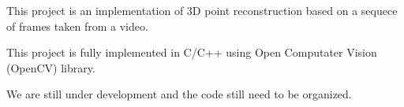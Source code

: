 This project is an implementation of 3D point reconstruction based on a sequece of frames taken from a video.

This project is fully implemented in C/\+C++ using Open Computater Vision (Open\+CV) library.

We are still under development and the code still need to be organized. 